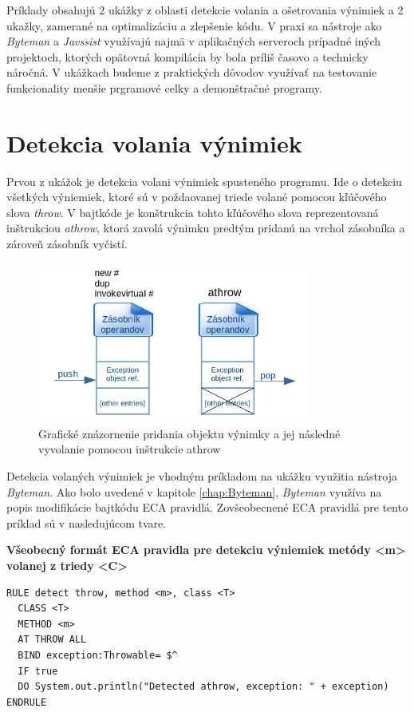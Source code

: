\documentclass[11pt,final,oneside]{fithesis}
\newenvironment{example}[1]
{
\vspace{3mm}
\noindent\textbf{#1}
\vspace{2mm}
}
{
\vspace{3mm}
}
\begin{document}
Príklady obsahujú 2 ukážky z oblasti detekcie volania a ošetrovania výnimiek a 2 ukažky, zamerané na optimalizáciu a zlepšenie kódu. V praxi sa nástroje ako
\textit{Byteman} a \textit{Javssist} využívajú najmä v aplikačných serveroch  prípadné iných projektoch, ktorých opätovná kompilácia by bola príliš časovo a technicky náročná. V ukážkach budeme z praktických dôvodov využívať na testovanie funkcionality menšie prgramové celky a demonštračné programy.

\section{Detekcia volania výnimiek}

Prvou z ukážok je detekcia volani výnimiek spusteného programu. Ide o detekciu všetkých výniemiek, ktoré sú v poždaovanej triede volané pomocou kľúčového slova \textit{throw}. V bajtkóde je konštrukcia tohto kľúčového slova reprezentovaná inštrukciou \textit{athrow}, ktorá zavolá výnimku predtým pridanú na vrchol zásobníka a zároveň zásobník vyčistí.

\begin{figure}[H]
  \centering
   \includegraphics[width=0.80\textwidth]{throw.png}
  \caption{Grafické znázornenie pridania objektu výnimky a jej následné vyvolanie pomocou inštrukcie athrow}
  \label{fig:throw}
\end{figure}

Detekcia volaných výnimiek je vhodným príkladom na ukážku využitia nástroja \textit{Byteman}. Ako bolo uvedené v kapitole \ref{chap:Byteman}, \textit{Byteman} využíva na popis modifikácie bajtkódu ECA pravidlá. Zovšeobecnené ECA pravidlá pre tento príklad sú v nasledujúcom tvare.

\begin{example}{Všeobecný formát ECA pravidla pre detekciu výniemiek metódy <m> volanej z triedy <C>}
\begin{verbatim}
RULE detect throw, method <m>, class <T>
  CLASS <T>
  METHOD <m>
  AT THROW ALL
  BIND exception:Throwable= $^
  IF true
  DO System.out.println("Detected athrow, exception: " + exception)
ENDRULE
\end{verbatim}
\end{example}
\end{document}
